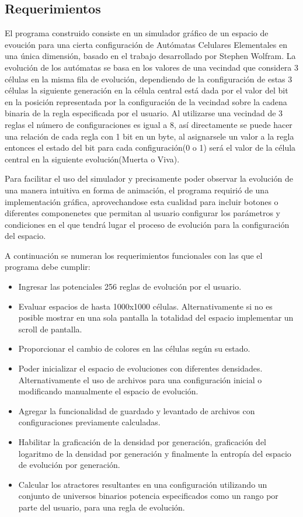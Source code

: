 \documentclass[]{article}
\begin{document}
		\newpage
		\subsection{Requerimientos}
			\hfill\break
			\justifying
			El programa construido consiste en un simulador gráfico de un espacio de evoución para una cierta configuración de Autómatas Celulares Elementales en  una única dimensión, basado en el trabajo desarrollado por Stephen Wolfram. 
			La evolución de los autómatas se basa en los valores de una vecindad que considera 3 células en la misma fila de evolución, dependiendo de la configuración de estas 3 células la siguiente generación en la célula central está dada por el valor del bit en la posición representada por la configuración de la vecindad sobre la cadena binaria de la regla especificada por el usuario.
			Al utilizarse una vecindad de 3 reglas el número de configuraciones es igual a 8, así directamente se puede hacer una relación de cada regla con 1 bit en un byte, al asignarsele un valor a la regla entonces el estado del bit para cada configuración(0 o 1) será el valor de la célula central en la siguiente evolución(Muerta o Viva).
			
			\hfill \break
			Para facilitar el uso del simulador y precisamente poder observar la evolución de una manera intuitiva en forma de animación, el programa requirió de una implementación gráfica, aprovechandose esta cualidad para incluir botones o diferentes componenetes que permitan al usuario configurar los parámetros y condiciones en el que tendrá lugar el proceso de evolución para la configuración del espacio.
			
			\hfill \break
			A continuación se numeran los requerimientos funcionales con las que el programa debe cumplir:
			\begin{itemize}
				\item Ingresar las potenciales 256 reglas de evolución por el usuario.
				\item Evaluar espacios de hasta 1000x1000 células. Alternativamente si no es posible mostrar en una sola pantalla la totalidad del espacio implementar un scroll de pantalla.
				\item Proporcionar el cambio de colores en las células según su estado.
				\item Poder inicializar el espacio de evoluciones con diferentes densidades. Alternativamente el uso de archivos para una configuración inicial o modificando manualmente el espacio de evolución.
				\item Agregar la funcionalidad de guardado y levantado de archivos con configuraciones previamente calculadas.
				\item Habilitar la graficación de la densidad por generación, graficación del logaritmo de la densidad por generación y finalmente la entropía del espacio de evolución por generación.
				\item Calcular los atractores resultantes en una configuración utilizando un conjunto de universos binarios potencia especificados como un rango por parte del usuario, para una regla de evolución.
			\end{itemize}
\end{document}
